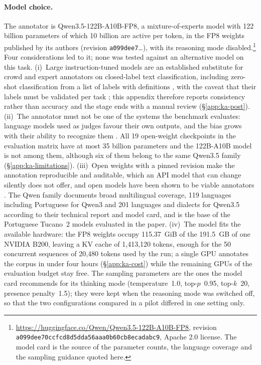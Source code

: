 \paragraph{Model choice.} The annotator is Qwen3.5-122B-A10B-FP8, a
mixture-of-experts model with 122 billion parameters of which 10 billion are
active per token, in the FP8 weights published by its authors (revision
\texttt{a099dee7}\ldots), with its reasoning mode disabled.\footnote{\url{https://huggingface.co/Qwen/Qwen3.5-122B-A10B-FP8}, revision \texttt{a099dee70ccfcd8d5dda56aaa0b60cb8ecadabc9}, Apache 2.0 license. The model card is the source of the parameter counts, the language coverage and the sampling guidance quoted here.} Four considerations led to it; none was tested
against an alternative model on this task. (i)~Large instruction-tuned
models are an established substitute for crowd and expert annotators on
closed-label text classification, including zero-shot classification from a
list of labels with definitions
\citep{ding2023gpt3,he2024annollm,tan2024survey},
with the caveat that their labels must be validated per task
\citep{gligoric2025unconfident}; this appendix therefore reports consistency
rather than accuracy and the stage ends with a manual review
(\S\ref{app:ka-post}). (ii)~The annotator must not be one of the systems the
benchmark evaluates: language models used as judges favour their own outputs,
and the bias grows with their ability to recognize them
\citep{panickssery2024llm,liu2024narcissistic}. All 19 open-weight checkpoints
in the evaluation matrix have at most 35 billion parameters and the
122B-A10B model is not among them, although six of them belong to the same
Qwen3.5 family (\S\ref{app:ka-limitations}). (iii)~Open weights with a pinned
revision make the annotation reproducible and auditable, which an API model
that can change silently does not offer, and open models have been shown to
be viable annotators \citep{alizadeh2025opensource}. The Qwen family
documents broad multilingual coverage, 119 languages including Portuguese for
Qwen3 and 201 languages and dialects for Qwen3.5 according to their technical
report and model card, and is the base of the Portuguese Tucano~2 models
evaluated in the paper. (iv)~The model fits the
available hardware: the FP8 weights occupy 115.37~GiB of the 191.5~GB of one
NVIDIA B200, leaving a KV cache of 1,413,120 tokens, enough for the 50
concurrent sequences of 20,480 tokens used by the run; a single GPU annotates
the corpus in under four hours (\S\ref{app:ka-cost}) while the remaining GPUs
of the evaluation budget stay free. The sampling parameters are the ones the
model card recommends for its thinking mode (temperature~1.0, top-$p$~0.95,
top-$k$~20, presence penalty~1.5); they were kept when the reasoning mode was
switched off, so that the two configurations compared in a pilot differed in
one setting only.

